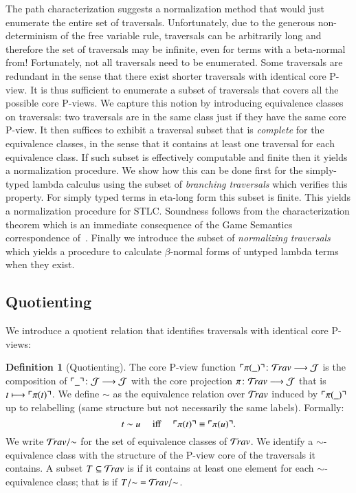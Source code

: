\documentclass{elsarticle}
\theoremstyle{plain}
\theoremstyle{definition}
\newtheorem{definition}{Definition}[section]
\theoremstyle{remark}
\newcommand{\travulc}{\travset}
\def\coresymbol{\pi} %
\newcommand{\core}[1]{\coresymbol(#1)} %
\def\justseqset{\mathcal{J}}
\begin{document}
The path characterization suggests a normalization method that would just enumerate the entire set of traversals. Unfortunately, due to the generous non-determinism of the free variable rule, traversals can be arbitrarily long and therefore the set of traversals may be infinite, even for terms with a beta-normal from! Fortunately, not all traversals need to be enumerated. Some traversals are redundant in the sense that there exist shorter traversals with identical core P-view. It is thus sufficient to enumerate a subset of traversals that covers all the possible core P-views.
We capture this notion by introducing equivalence classes on traversals: two traversals are in the same class just if they have the same core P-view. It then suffices to exhibit a traversal subset that is \emph{complete} for the equivalence classes, in the sense that it contains at least one traversal for each equivalence class. If such subset is effectively computable and finite then it yields a normalization procedure.
We show how this can be done first for the simply-typed lambda calculus using the subset of \emph{branching traversals} which verifies this property. For simply typed terms in eta-long form this subset is finite. This yields a normalization procedure for STLC. Soundness follows from the characterization theorem which is an immediate consequence of the Game Semantics correspondence of~\cite{BlumPhd}. Finally we introduce the subset of \emph{normalizing traversals} which yields a  procedure to calculate $\beta$-normal forms of untyped lambda terms when they exist.

\subsection{Quotienting}

We introduce a quotient relation that identifies traversals with identical core P-views:
\begin{definition}[Quotienting]
The core P-view function
$\pview{\core{\_}} \colon \travulc \longrightarrow \justseqset $
is the composition of $\pview{\_}\colon \justseqset \longrightarrow \justseqset$ with the core projection $\coresymbol\colon\travulc  \longrightarrow \justseqset$ that is $t \longmapsto \pview{\core{t}}$.
We define $\sim$ as the equivalence relation over $\travulc$ induced by $\pview{\core{\_}}$ up to relabelling (same structure but not necessarily the same labels). Formally:
$$t \sim u \quad \mbox{ iff } \quad  \pview{\core{t}} \equiv \pview{\core{u}} .$$
We write $\travulc/{\sim}$ for the set of equivalence classes of $\travulc$. We identify a $\sim$-equivalence class with the structure of the P-view core of the traversals it contains. A subset $T\subseteq \travulc$ is  if it contains at least one element for each $\sim$-equivalence class; that is if $T/{\sim} = \travulc/{\sim}$.
\end{definition}
\end{document}

